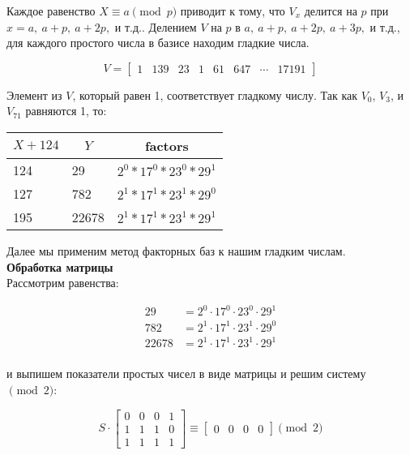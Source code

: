 \documentclass[12pt,a4paper]{scrartcl}
\begin{document}
Каждое равенство $X\equiv a{\pmod {p}}$ приводит к тому, что $V_{x}$ делится на $p$ при $x=a,\ a+p,\ a+2p,$ и т.д.. Делением $V$ на $p$ в $a,\ a+p,\ a+2p,\ a+3p,$ и т.д., для каждого простого числа в базисе находим гладкие числа.

$$V={\begin{bmatrix}1&139&23&1&61&647&\cdots &17191\end{bmatrix}}$$

Элемент из $V$, который равен 1, соответствует гладкому числу. Так как $V_{0}$, $V_{3}$, и $V_{71}$ равняются 1, то:


\begin{table}[H]
	\centering
	\begin{tabular}{|l|l|l|}
		\hline
		\multicolumn{1}{|c|}{\textit{\textbf{$X+124$}}} & \multicolumn{1}{c|}{\textit{\textbf{$Y$}}} & \multicolumn{1}{c|}{\textbf{factors}} \\ \hline
		124                                             & 29                                         & $2^0 * 17^0 * 23^0 * 29^1$            \\ \hline
		127                                             & 782                                        & $2^1 * 17^1 * 23^1 * 29^0$            \\ \hline
		195                                             & 22678                                      & $2^1 * 17^1 * 23^1 * 29^1$            \\ \hline
	\end{tabular}
\end{table}

Далее мы применим метод факторных баз к нашим гладким числам.\\

\textbf{Обработка матрицы}\\

Рассмотрим равенства:

$${\begin{aligned}29&=2^{0}\cdot 17^{0}\cdot 23^{0}\cdot 29^{1}\\782&=2^{1}\cdot 17^{1}\cdot 23^{1}\cdot 29^{0}\\22678&=2^{1}\cdot 17^{1}\cdot 23^{1}\cdot 29^{1}\\\end{aligned}}$$

и выпишем показатели простых чисел в виде матрицы и решим систему ${\pmod {2}}$:

$$S\cdot {\begin{bmatrix}0&0&0&1\\1&1&1&0\\1&1&1&1\end{bmatrix}}\equiv {\begin{bmatrix}0&0&0&0\end{bmatrix}}{\pmod {2}}$$
\end{document}
